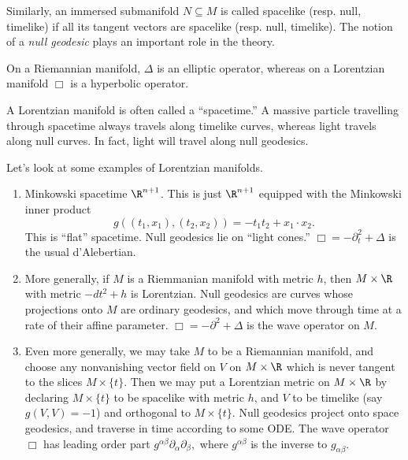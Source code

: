 \documentclass[12pt]{article}
\begin{document}
Similarly, an immersed submanifold $N \subseteq M$ is called spacelike (resp. null, timelike) if all its tangent vectors are spacelike (resp. null, timelike). The notion of a \emph{null geodesic} plays an important role in the theory.

On a Riemannian manifold, $\Delta$ is an elliptic operator, whereas on a Lorentzian manifold $\Box$ is a hyperbolic operator.
 
 A Lorentzian manifold is often called a ``spacetime.'' A massive particle travelling through spacetime always travels along timelike curves, whereas light travels along null curves. In fact, light will travel along null geodesics.

Let's look at some examples of Lorentzian manifolds.
\begin{enumerate}

\item Minkowski spacetime $\R^{n+1}$. This is just $\R^{n+1}$ equipped with the Minkowski inner product
\[g((t_1,x_1),(t_2,x_2)) = -t_1t_2 + x_1\cdot x_2.\] This is ``flat'' spacetime. Null geodesics lie on ``light cones.'' $\Box = -\partial_t^2 + \Delta $ is the usual d'Alebertian. 

\item More generally, if $M$ is a Riemmanian manifold with metric $h$, then $M\times \R$ with metric $-dt^2 + h$ is Lorentzian. Null geodesics are curves whose projections onto $M$ are ordinary geodesics, and which move through time at a rate of their affine parameter. $\Box = -\partial^2 + \Delta$ is the wave operator on $M$.

\item Even more generally, we may take $M$ to be a Riemannian manifold, and choose any nonvanishing vector field on $V$ on $M\times \R$ which is never tangent to the slices $M \times \{t\}$. Then we may put a Lorentzian metric on $M\times \R$ by declaring $M \times \{t\}$ to be spacelike with metric $h$, and $V$ to be timelike (say $g(V,V) = -1$) and orthogonal to $M \times \{t\}$. Null geodesics project onto space geodesics, and traverse in time according to some ODE. The wave operator $\Box$ has leading order part
$g^{\alpha\beta}\partial_{\alpha}\partial_{\beta},$ where $g^{\alpha\beta}$ is the inverse to $g_{\alpha\beta}$.
\end{enumerate}
\end{document}
